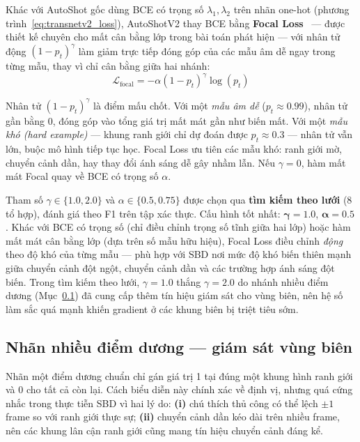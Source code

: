 Khác với AutoShot gốc dùng BCE có trọng số $\lambda_1, \lambda_2$ trên nhãn one-hot (phương trình~\eqref{eq:transnetv2_loss}), AutoShotV2 thay BCE bằng \textbf{Focal Loss}~\cite{Lin2017FocalLoss} --- được thiết kế chuyên cho mất cân bằng lớp trong bài toán phát hiện --- với nhân tử động $(1-p_t)^{\gamma}$ làm giảm trực tiếp đóng góp của các mẫu âm dễ ngay trong từng mẫu, thay vì chỉ cân bằng giữa hai nhánh:
\begin{equation}
    \mathcal{L}_{\text{focal}} = -\alpha(1-p_t)^{\gamma}\log(p_t)
    \label{eq:focal_loss}
\end{equation}

Nhân tử $(1-p_t)^{\gamma}$ là điểm mấu chốt. Với một \textit{mẫu âm dễ} ($p_t \approx 0.99$), nhân tử gần bằng 0, đóng góp vào tổng giá trị mất mát gần như biến mất. Với một \textit{mẫu khó (hard example)} --- khung ranh giới chỉ dự đoán được $p_t \approx 0.3$ --- nhân tử vẫn lớn, buộc mô hình tiếp tục học. Focal Loss ưu tiên các mẫu khó: ranh giới mờ, chuyển cảnh dần, hay thay đổi ánh sáng dễ gây nhầm lẫn. Nếu $\gamma = 0$, hàm mất mát Focal quay về BCE có trọng số $\alpha$.

Tham số $\gamma \in \{1.0, 2.0\}$ và $\alpha \in \{0.5, 0.75\}$ được chọn qua \textbf{tìm kiếm theo lưới} (8 tổ hợp), đánh giá theo F1 trên tập xác thực. Cấu hình tốt nhất: $\boldsymbol{\gamma = 1.0}$, $\boldsymbol{\alpha = 0.5}$. Khác với BCE có trọng số (chỉ điều chỉnh trọng số tĩnh giữa hai lớp) hoặc hàm mất mát cân bằng lớp (dựa trên số mẫu hữu hiệu), Focal Loss điều chỉnh \textit{động} theo độ khó của từng mẫu --- phù hợp với SBD nơi mức độ khó biến thiên mạnh giữa chuyển cảnh đột ngột, chuyển cảnh dần và các trường hợp ánh sáng đột biến. Trong tìm kiếm theo lưới, $\gamma=1.0$ thắng $\gamma=2.0$ do nhánh nhiều điểm dương (Mục~\ref{subsec:v2_manyhot}) đã cung cấp thêm tín hiệu giám sát cho vùng biên, nên hệ số làm sắc quá mạnh khiến gradient ở các khung biên bị triệt tiêu sớm.

\subsection{Nhãn nhiều điểm dương --- giám sát vùng biên}
\label{subsec:v2_manyhot}

Nhãn một điểm dương chuẩn chỉ gán giá trị 1 tại đúng một khung hình ranh giới và 0 cho tất cả còn lại. Cách biểu diễn này chính xác về định vị, nhưng quá cứng nhắc trong thực tiễn SBD vì hai lý do: \textbf{(i)} chú thích thủ công có thể lệch $\pm1$ frame so với ranh giới thực sự; \textbf{(ii)} chuyển cảnh dần kéo dài trên nhiều frame, nên các khung lân cận ranh giới cũng mang tín hiệu chuyển cảnh đáng kể.

